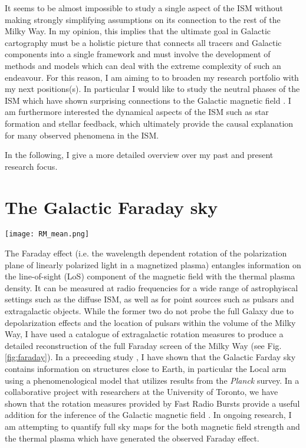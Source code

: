 It seems to be almost impossible to study a single aspect of the ISM without making strongly simplifying assumptions on its connection to the rest of the Milky Way.
In my opinion, this implies that the ultimate goal in Galactic cartography must be a holistic picture that connects all tracers and Galactic components into a single framework and must involve the development of methods and models which can deal with the extreme complexity of such an endeavour.
For this reason, I am aiming to to broaden my research portfolio with my next positions(s).
In particular I would like to study the neutral phases of the ISM which have shown surprising connections to the Galactic magnetic field \citep{2014Clark}.
I am furthermore interested the dynamical aspects of the ISM such as star formation and stellar feedback, which ultimately provide the causal explanation for many observed phenomena in the ISM.\par
In the following, I give a more detailed overview over my past and present research focus.


\section{The Galactic Faraday sky}

\begin{center}
  \texttt{[image: RM\_mean.png]}
\end{center}


The Faraday effect (i.e. the wavelength dependent rotation of the polarization plane of linearly polarized light in a magnetized plasma) entangles information on the line-of-sight (LoS) component of the magnetic field with the thermal plasma density.
It can be measured at radio frequencies for a wide range of astrophyiscal settings such as the diffuse ISM, as well as for point sources such as pulsars and extragalactic objects.
While the former two do not probe the full Galaxy due to depolarization effects and the location of pulsars within the volume of the Milky Way, I have used a catalogue of extragalactic rotation measures to produce a detailed reconstruction of the full Faraday screen of the Milky Way \citep{2022Hutschenreuter} (see Fig. \ref{fig:faraday}).
In a preceeding study \citep{2019Hutschenreuter}, I have shown that the Galactic Farday sky contains information on structures close to Earth, in particular the Local arm using a phenomenological model that utilizes results from the \textit{Planck} survey.
In a collaborative project with researchers at the University of Toronto, we have shown that the rotation measures provided by Fast Radio Bursts provide a useful addition for the inference of the Galactic magnetic field \citep{2022Pandhi}.
In ongoing research, I am attempting to quantify full sky maps for the both magnetic field strength and the thermal plasma which have generated the observed Faraday effect.


